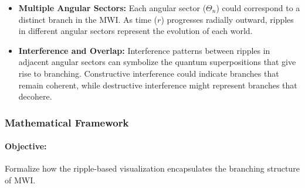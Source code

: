 \documentclass[12pt]{article}
\begin{document}
\begin{itemize}
    \item \textbf{Multiple Angular Sectors:} Each angular sector (\(\Theta_n\)) could correspond to a distinct branch in the MWI. As time (\(r\)) progresses radially outward, ripples in different angular sectors represent the evolution of each world.
    
    \item \textbf{Interference and Overlap:} Interference patterns between ripples in adjacent angular sectors can symbolize the quantum superpositions that give rise to branching. Constructive interference could indicate branches that remain coherent, while destructive interference might represent branches that decohere.
\end{itemize}

\subsubsection{Mathematical Framework}
\paragraph{Objective:} Formalize how the ripple-based visualization encapsulates the branching structure of MWI.
\end{document}

